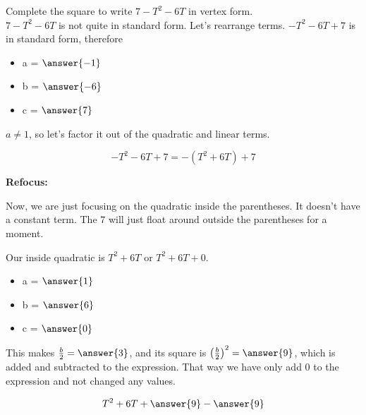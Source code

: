 \documentclass{ximera}
\author{Lee Wayand}
\begin{document}
\begin{exercise} 


Complete the square to write $7 - T^2 - 6T$ in vertex form. \\



$7 - T^2 - 6T$ is not quite in standard form. Let's rearrange terms. $-T^2 - 6T + 7$ is in standard form, therefore



\begin{itemize}
\item  a = $\answer{-1}$ \\
\item  b = $\answer{-6}$ \\
\item  c = $\answer{7}$ \\
\end{itemize}




$a \ne 1$, so let's factor it out of the quadratic and linear terms.



\[   -T^2 - 6T + 7 = -(T^2 + 6T) + 7   \]




\begin{procedure} \textbf{Refocus:}  


Now, we are just focusing on the quadratic inside the parentheses.  It doesn't have a constant term.  The $7$ will just float around outside the parentheses for a moment.



Our inside quadratic is $T^2 + 6T$ or $T^2 + 6T + 0$.


\begin{itemize}
\item  a = $\answer{1}$ \\
\item  b = $\answer{6}$ \\
\item  c = $\answer{0}$ \\
\end{itemize}



This makes $\frac{b}{2} = \answer{3}$, and its square is $\left( \frac{b}{2} \right)^2 = \answer{9}$, which is added and subtracted to the expression.  That way we have only add $0$ to the expression and not changed any values. 


\[ T^2 + 6T + \answer{9} - \answer{9} \]




\end{procedure}
\end{exercise}
\end{document}
